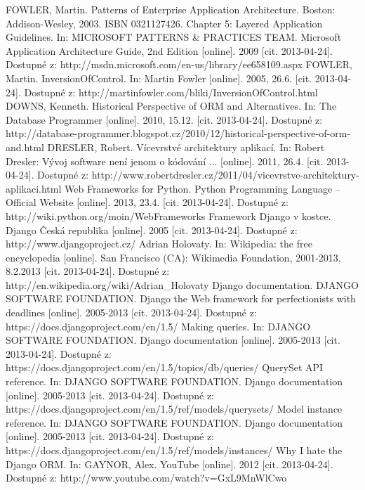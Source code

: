 \documentclass[ing,male,java,dept456]{diploma}						%
\begin{document}
\begin{thebibliography}{99}

 FOWLER, Martin. Patterns of Enterprise Application Architecture. Boston: Addison-Wesley, 2003. ISBN 0321127426.
 Chapter 5: Layered Application Guidelines. In: MICROSOFT PATTERNS \& PRACTICES TEAM. Microsoft Application Architecture Guide, 2nd Edition [online]. 2009 [cit. 2013-04-24]. Dostupné z: http://msdn.microsoft.com/en-us/library/ee658109.aspx
 FOWLER, Martin. InversionOfControl. In: Martin Fowler [online]. 2005, 26.6. [cit. 2013-04-24]. Dostupné z: http://martinfowler.com/bliki/InversionOfControl.html
 DOWNS, Kenneth. Historical Perspective of ORM and Alternatives. In: The Database Programmer [online]. 2010, 15.12. [cit. 2013-04-24]. Dostupné z: http://database-programmer.blogspot.cz/2010/12/historical-perspective-of-orm-and.html
 DRESLER, Robert. Vícevrstvé architektury aplikací. In: Robert Dresler: Vývoj software není jenom o kódování ... [online]. 2011, 26.4. [cit. 2013-04-24]. Dostupné z: http://www.robertdresler.cz/2011/04/vicevrstve-architektury-aplikaci.html
 Web Frameworks for Python. Python Programming Language – Official Website [online]. 2013, 23.4. [cit. 2013-04-24]. Dostupné z: http://wiki.python.org/moin/WebFrameworks
 Framework Django v kostce. Django Česká republika [online]. 2005 [cit. 2013-04-24]. Dostupné z: http://www.djangoproject.cz/
 Adrian Holovaty. In: Wikipedia: the free encyclopedia [online]. San Francisco (CA): Wikimedia Foundation, 2001-2013, 8.2.2013 [cit. 2013-04-24]. Dostupné z: http://en.wikipedia.org/wiki/Adrian\_Holovaty
 Django documentation. DJANGO SOFTWARE FOUNDATION. Django the Web framework for perfectionists with deadlines [online]. 2005-2013 [cit. 2013-04-24]. Dostupné z: https://docs.djangoproject.com/en/1.5/
 Making queries. In: DJANGO SOFTWARE FOUNDATION. Django documentation [online]. 2005-2013 [cit. 2013-04-24]. Dostupné z: https://docs.djangoproject.com/en/1.5/topics/db/queries/
 QuerySet API reference. In: DJANGO SOFTWARE FOUNDATION. Django documentation [online]. 2005-2013 [cit. 2013-04-24]. Dostupné z: https://docs.djangoproject.com/en/1.5/ref/models/querysets/
 Model instance reference. In: DJANGO SOFTWARE FOUNDATION. Django documentation [online]. 2005-2013 [cit. 2013-04-24]. Dostupné z: https://docs.djangoproject.com/en/1.5/ref/models/instances/
 Why I hate the Django ORM. In: GAYNOR, Alex. YouTube [online]. 2012 [cit. 2013-04-24]. Dostupné z: http://www.youtube.com/watch?v=GxL9MnWlCwo

\end{thebibliography}
\end{document}
